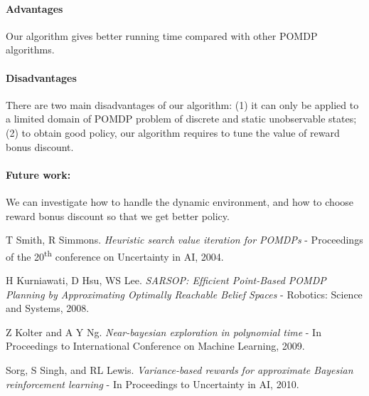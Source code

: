 \documentclass{article}
\begin{document}
\paragraph{Advantages} Our algorithm gives better running time compared with
other POMDP algorithms.
\paragraph{Disadvantages} There are two main disadvantages of our algorithm: (1)
it can only be applied to a limited domain of POMDP problem of discrete and 
static unobservable states; (2) to obtain good policy, our algorithm requires
to tune the value of reward bonus discount.
\paragraph{Future work:} We can investigate how to handle the dynamic environment, and how to choose reward bonus discount so that we get better policy.


\begin{thebibliography}{9}

	T Smith, R Simmons. \emph{Heuristic search value iteration for POMDPs} - Proceedings of the 20\textsuperscript{th} conference on Uncertainty in AI, 2004.

	H Kurniawati, D Hsu, WS Lee. \emph{SARSOP: Efﬁcient Point-Based POMDP Planning by Approximating Optimally Reachable Belief Spaces} - Robotics: Science and Systems, 2008.

	Z Kolter and A Y Ng. \emph{Near-bayesian exploration in polynomial time} - In Proceedings to International Conference on Machine Learning, 2009.

	Sorg, S Singh, and RL Lewis. \emph{Variance-based rewards for approximate Bayesian reinforcement learning} - In Proceedings to Uncertainty in AI, 2010.

\end{thebibliography}
\end{document}
